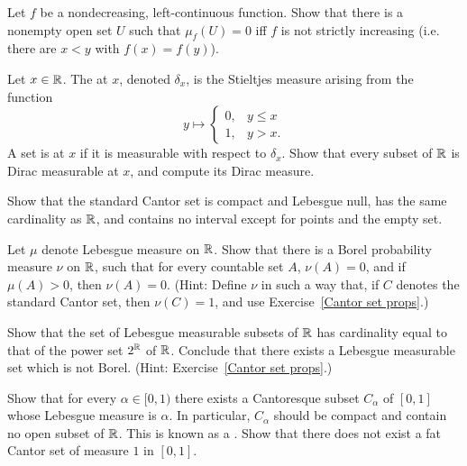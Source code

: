 \begin{exercise}
Let $f$ be a nondecreasing, left-continuous function. Show that there is a nonempty open set $U$ such that $\mu_f(U) = 0$ iff $f$ is not strictly increasing (i.e. there are $x < y$ with $f(x) = f(y)$).
\end{exercise}

\begin{exercise}
\label{Dirac measure}
Let $x \in \mathbb{R}$. The  at $x$, denoted $\delta_x$, is the Stieltjes measure arising from the function
$$y \mapsto \begin{cases}
0, &y \leq x\\
1, &y > x.
\end{cases}$$
A set is  at $x$ if it is measurable with respect to $\delta_x$.
Show that every subset of $\mathbb{R}$ is Dirac measurable at $x$, and compute its Dirac measure.
\end{exercise}

\begin{exercise}
\label{Cantor set props}
Show that the standard Cantor set is compact and Lebesgue null, has the same cardinality as $\mathbb{R}$, and contains no interval except for points and the empty set.
\end{exercise}

\begin{exercise}
Let $\mu$ denote Lebesgue measure on $\mathbb{R}$.
Show that there is a Borel probability measure $\nu$ on $\mathbb{R}$, such that for every countable set $A$, $\nu(A) = 0$, and if $\mu(A) > 0$, then $\nu(A) = 0$.
(Hint: Define $\nu$ in such a way that, if $C$ denotes the standard Cantor set, then $\nu(C) = 1$, and use Exercise~\ref{Cantor set props}.)
\end{exercise}

\begin{exercise}
Show that the set of Lebesgue measurable subsets of $\mathbb{R}$ has cardinality equal to that of the power set $2^{\mathbb{R}}$ of $\mathbb{R}$. Conclude that there exists a Lebesgue measurable set which is not Borel.
(Hint: Exercise~\ref{Cantor set props}.)
\end{exercise}

\begin{exercise}
\label{fat cat}
Show that for every $\alpha \in [0, 1)$ there exists a Cantoresque subset $C_\alpha$ of $[0, 1]$ whose Lebesgue measure is $\alpha$.
In particular, $C_\alpha$ should be compact and contain no open subset of $\mathbb{R}$.
This is known as a .
Show that there does not exist a fat Cantor set of measure $1$ in $[0, 1]$.
\end{exercise}

